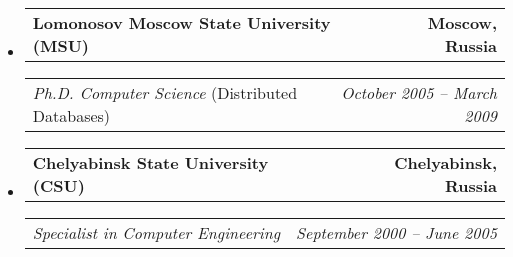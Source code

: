 \documentclass[11pt,letterpaper]{article}
\makeatletter
\newcommand{\headerrow}[2]
{\begin{tabular*}{\linewidth}{l@{\extracolsep{\fill}}r}
#1 &
#2 \\
\end{tabular*}}
\makeatother
\begin{document}
\begin{itemize}[leftmargin=1em]
	\parskip=0.1em
		
	\item
	      \headerrow
	      {\textbf{Lomonosov Moscow State University (MSU)}}
	      {\textbf{Moscow, Russia}}
	      \headerrow
	      {\emph{Ph.D. Computer Science} (Distributed Databases)}
	      {\emph{October 2005 -- March 2009}}
	\item
	      \headerrow
	      {\textbf{Chelyabinsk State University (CSU)}}
	      {\textbf{Chelyabinsk, Russia}}
	      \headerrow
	      {\emph{Specialist in Computer Engineering}}
	      {\emph{September 2000 -- June 2005}}
	      	      
\end{itemize}
\end{document}
